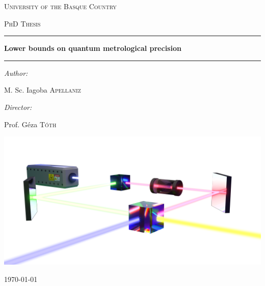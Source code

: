 

\begin{center}

\vspace*{20pt}
\textsc{\LARGE University of the Basque Country}

\vspace{20pt}
\textsc{\Large PhD Thesis}

\vspace{50pt}
\hrule

\vspace{16pt}
{\huge \bfseries Lower bounds on quantum metrological precision}
\vspace{16pt}

\hrule
\vspace{40pt}

\begin{minipage}{0.4\textwidth}
\begin{flushleft} \large
\emph{Author:}


M. Sc. Iagoba \textsc{Apellaniz}
\end{flushleft}
\end{minipage}
\begin{minipage}{0.4\textwidth}
\begin{flushright} \large
\emph{Director:}

Prof. G\'eza \textsc{T\'oth} %
\end{flushright}
\end{minipage}

\vspace{40pt}
\includegraphics[width=0.8\hsize]{img/cover3Dpicture.png}
\vfill

{\large \today}

\end{center}

\cleardoublepage
